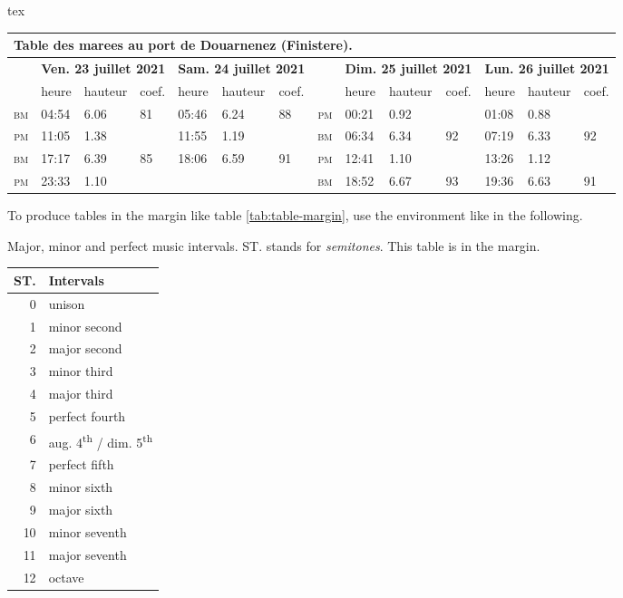 \documentclass[
	raggedright,
	12pt,
	colorful,
]{tufte-style-article}
\begin{document}
\begin{codebox}{tex}
\begin{table*}[!htb]\small\sffamily
	\begin{tabularx}{\linewidth}{rXXXXXXrXXXXXX}
		\multicolumn{14}{l}{\textbf{Table des marees au port de Douarnenez (Finistere).}} \\
		\toprule
			& \multicolumn{3}{c}{\textbf{Ven. 23 juillet 2021}} & \multicolumn{3}{c}{\textbf{Sam. 24 juillet 2021}} & & \multicolumn{3}{c}{\textbf{Dim. 25 juillet 2021}} & \multicolumn{3}{c}{\textbf{Lun. 26 juillet 2021}} \\
			& heure & hauteur & coef. & heure & hauteur & coef. & & heure & hauteur & coef. & heure & hauteur & coef. \\
		\cmidrule(lr){2-4}\cmidrule(lr){5-7}\cmidrule(lr){9-11}\cmidrule(lr){12-14}
		\textsc{bm} & 04:54 & 6.06 & 81 & 05:46 & 6.24 & 88 & \textsc{pm} & 00:21 & 0.92 &  & 01:08 & 0.88 &  \\
		\textsc{pm} & 11:05 & 1.38 &  & 11:55 & 1.19 &  & \textsc{bm} & 06:34 & 6.34 & 92 & 07:19 & 6.33 & 92 \\
		\textsc{bm} & 17:17 & 6.39 & 85 & 18:06 & 6.59 & 91 & \textsc{pm} & 12:41 & 1.10 &  & 13:26 & 1.12 &  \\
		\textsc{pm} & 23:33 & 1.10 &  &  &  &  & \textsc{bm} & 18:52 & 6.67 & 93 & 19:36 & 6.63 & 91 \\
		\bottomrule
	\end{tabularx}
	\sidecaption{%
	}
\end{table*}\FloatBarrier
\end{codebox}

To produce tables in the margin like table \ref{tab:table-margin}, use the  environment like in the following.

\begin{margintable}[0pt]\small
\caption{Major, minor and perfect music intervals. ST. stands for \textit{semitones}. This table is in the margin. \label{tab:table-margin}}
\begin{tabular}{rl}
	\toprule
	\textbf{ST.} & \textbf{Intervals} \\
	\midrule
	0 & unison \\
	1 & minor second \\
	2 & major second \\
	3 & minor third \\
	4 & major third \\
	5 & perfect fourth \\
	6 & aug. 4\textsuperscript{th} / dim. 5\textsuperscript{th} \\
	7 & perfect fifth \\
	8 & minor sixth \\
	9 & major sixth \\
	10 & minor seventh \\
	11 & major seventh \\
	12 & octave \\
	\bottomrule
\end{tabular}
\end{margintable}
\end{document}
